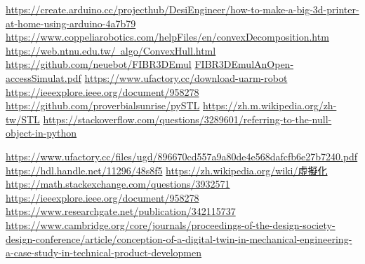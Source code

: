 \newpage
\renewcommand\bibname{參~考~文~獻}
\begin{thebibliography}{99}  %
\href{https://create.arduino.cc/projecthub/DesiEngineer/how-to-make-a-big-3d-printer-at-home-using-arduino-4a7b79}{https://create.arduino.cc/projecthub/DesiEngineer/how-to-make-a-big-3d-printer-at-home-using-arduino-4a7b79}
\href{https://www.coppeliarobotics.com/helpFiles/en/convexDecomposition.htm}{https://www.coppeliarobotics.com/helpFiles/en/convexDecomposition.htm}
\href{https://web.ntnu.edu.tw/~algo/ConvexHull.html}{https://web.ntnu.edu.tw/~algo/ConvexHull.html}
\href{https://github.com/neuebot/FIBR3DEmul}{https://github.com/neuebot/FIBR3DEmul}
\href{https://repositorium.sdum.uminho.pt/bitstream/1822/69730/1/Faria2020_Article_FIBR3DEmulAnOpen-accessSimulat.pdf}{FIBR3DEmulAnOpen-accessSimulat.pdf}
\href{https://www.ufactory.cc/download-uarm-robot}{https://www.ufactory.cc/download-uarm-robot}
\href{https://ieeexplore.ieee.org/document/958278}{https://ieeexplore.ieee.org/document/958278}
\href{https://github.com/proverbialsunrise/pySTL}{https://github.com/proverbialsunrise/pySTL}
\href{https://zh.m.wikipedia.org/zh-tw/STL}{https://zh.m.wikipedia.org/zh-tw/STL}
\href{https://stackoverflow.com/questions/3289601/referring-to-the-null-object-in-python}{https://stackoverflow.com/questions/3289601/referring-to-the-null-object-in-python}

\href{https://www.ufactory.cc/_files/ugd/896670_cd557a9a80de4e568dafcfb6e27b7240.pdf}{https://www.ufactory.cc/files/ugd/896670cd557a9a80de4e568dafcfb6e27b7240.pdf}
\href{https://hdl.handle.net/11296/48s8f5}{https://hdl.handle.net/11296/48s8f5}
\href{https://zh.wikipedia.org/wiki/%E8%99%9B%E6%93%AC%E5%8C%96}{https://zh.wikipedia.org/wiki/虛擬化}
\href{https://math.stackexchange.com/questions/3932571/how-to-integrate-over-all-space-in-polar-coordinates}{https://math.stackexchange.com/questions/3932571}
\href{https://ieeexplore.ieee.org/document/958278}{https://ieeexplore.ieee.org/document/958278}
\href{https://www.researchgate.net/publication/342115737_WHAT_IS_A_DIGITAL_TWIN_-_DEFINITIONS_AND_INSIGHTS_FROM_AN_INDUSTRIAL_CASE_STUDY_IN_TECHNICAL_PRODUCT_DEVELOPMENT}{https://www.researchgate.net/publication/342115737}
\href{https://www.cambridge.org/core/journals/proceedings-of-the-design-society-design-conference/article/conception-of-a-digital-twin-in-mechanical-engineering-a-case-study-in-technical-product-development/2E2916B3DC1F42028CD2CDACAB6FA6AC}{https://www.cambridge.org/core/journals/proceedings-of-the-design-society-design-conference/article/conception-of-a-digital-twin-in-mechanical-engineering-a-case-study-in-technical-product-developmen}
%
\end{thebibliography}
\newpage 